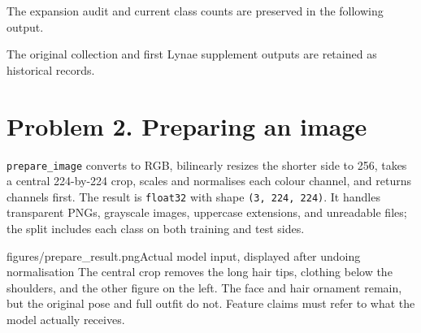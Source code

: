 \documentclass[11pt]{article}
\begin{document}
The expansion audit and current class counts are preserved in the following output.

The original collection and first Lynae supplement outputs are retained as historical records.

\section*{Problem 2. Preparing an image}
\texttt{prepare\_image} converts to RGB, bilinearly resizes the shorter side to 256, takes a central 224-by-224 crop, scales and normalises each colour channel, and returns channels first. The result is \texttt{float32} with shape \texttt{(3, 224, 224)}. It handles transparent PNGs, grayscale images, uppercase extensions, and unreadable files; the split includes each class on both training and test sides.

           {figures/prepare_result.png}{Actual model input, displayed after undoing normalisation}
The central crop removes the long hair tips, clothing below the shoulders, and the other figure on the left. The face and hair ornament remain, but the original pose and full outfit do not. Feature claims must refer to what the model actually receives.
\end{document}
